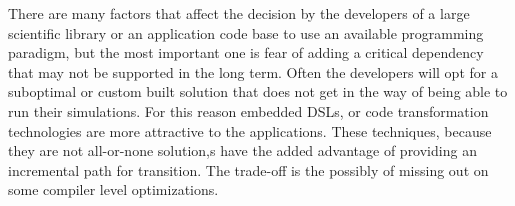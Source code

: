
There are many factors that affect the decision by the developers of a
large scientific library or an application code base to use an 
available programming paradigm, but the most important one is fear of
adding a critical dependency that may not be supported in the long
term. Often the developers will opt for a suboptimal or custom built
solution that does not get in the way of being able to run their
simulations. For this reason embedded DSLs, or code transformation
technologies are more attractive to the applications. These
techniques, because they are not all-or-none solution,s have the added
advantage of providing an incremental path for transition. The trade-off
is the possibly of missing out on some compiler level optimizations.  

